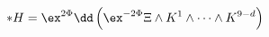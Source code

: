 \begin{equation} 
\label{exp9}
   *H = \ex^{2\Phi} 
   \dd\left( \ex^{-2\Phi} \Xi\wedge K^1\wedge\dots\wedge K^{9-d} \right)
\end{equation}


